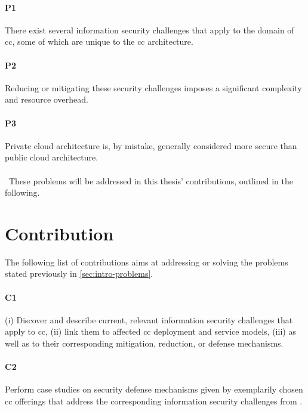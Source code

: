 	\paragraph{P1}\label{p1} There exist several information security challenges that apply to the domain of \ac{cc}, some of which are unique to the \ac{cc} architecture.
	
	\paragraph{P2}\label{p2} Reducing or mitigating these security challenges imposes a significant complexity and resource overhead.
	
	\paragraph{P3}\label{p3} Private cloud architecture is, by mistake, generally considered more secure than public cloud architecture.
	\\\ \\\
	These problems will be addressed in this thesis' contributions, outlined in the following.


	\section{Contribution} \label{sec:intro-contribution}
	
	The following list of contributions aims at addressing or solving the problems stated previously in \autoref{sec:intro-problems}.
	
	\paragraph{C1}\label{c1} (i) Discover and describe current, relevant information security challenges that apply to \ac{cc}, (ii) link them to affected \ac{cc} deployment and service models, (iii) as well as to their corresponding mitigation, reduction, or defense mechanisms.
	
	\paragraph{C2}\label{c2} Perform case studies on security defense mechanisms given by exemplarily chosen \ac{cc} offerings that address the corresponding information security challenges from .
	
